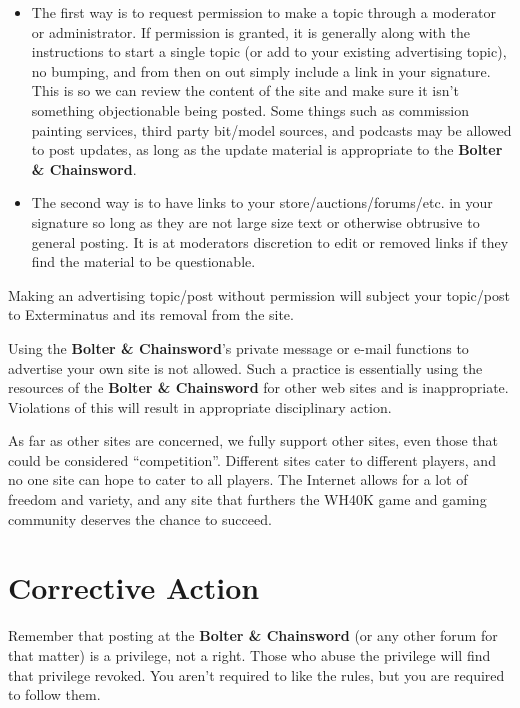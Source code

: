 \documentclass[12pt]{article}
\newcommand{\bnc}{{\textbf{Bolter \& Chainsword}}}%
\begin{document}
\begin{table}[H]
\begin{itemize}
\item The first way is to request permission to make a topic through a 
moderator or administrator. If permission is granted, it is generally 
along with the instructions to start a single topic (or add to your 
existing advertising topic), no bumping, and from then on out simply 
include a link in your signature. This is so we can review the content 
of the site and make sure it isn't something objectionable being 
posted. Some things such as commission painting services, third party 
bit/model sources, and podcasts may be allowed to post updates, as long 
as the update material is appropriate to the {\bnc}.

\item The second way is to have links to your store/auctions/forums/etc. in 
your signature so long as they are not large size text or otherwise 
obtrusive to general posting. It is at moderators discretion to edit or 
removed links if they find the material to be questionable.
\end{itemize}
	\caption{Main methods for advertising allowed on {\bnc}}
\end{table}

Making an advertising topic/post without permission will subject your 
topic/post to Exterminatus and its removal from the site.

Using the {\bnc}'s private message or e-mail functions to 
advertise your own site is not allowed. Such a practice is essentially 
using the resources of the {\bnc} for other web sites and 
is inappropriate. Violations of this will result in appropriate 
disciplinary action.

As far as other sites are concerned, we fully support other sites, even 
those that could be considered ``competition''. Different sites cater to 
different players, and no one site can hope to cater to all players. 
The Internet allows for a lot of freedom and variety, and any site that 
furthers the WH40K game and gaming community deserves the chance to 
succeed.

\section{Corrective Action}

Remember that posting at the {\bnc} (or any other forum 
for that matter) is a privilege, not a right. Those who abuse the 
privilege will find that privilege revoked. You aren't required to like 
the rules, but you are required to follow them.
\end{document}

